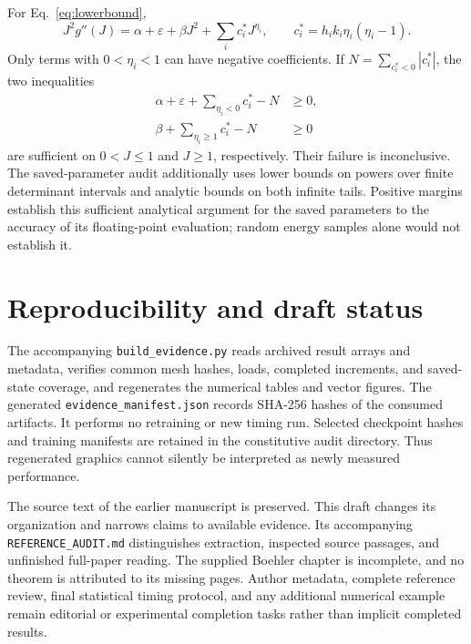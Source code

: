 \documentclass[10pt,a4paper]{article}
\begin{document}
For Eq.~\eqref{eq:lowerbound},
\begin{equation}
 J^2g''(J)=\alpha+\varepsilon+\beta J^2+\sum_i c_i^*J^{\eta_i},
 \qquad c_i^*=h_i k_i\eta_i(\eta_i-1).
\end{equation}
Only terms with $0<\eta_i<1$ can have negative coefficients. If $N=\sum_{c_i^*<0}|c_i^*|$, the two inequalities
\begin{align}
 \alpha+\varepsilon+\sum_{\eta_i<0}c_i^*-N&\geq0,\\
 \beta+\sum_{\eta_i\geq1}c_i^*-N&\geq0
\end{align}
are sufficient on $0<J\leq1$ and $J\geq1$, respectively. Their failure is inconclusive. The saved-parameter audit additionally uses lower bounds on powers over finite determinant intervals and analytic bounds on both infinite tails. Positive margins establish this sufficient analytical argument for the saved parameters to the accuracy of its floating-point evaluation; random energy samples alone would not establish it.

\section{Reproducibility and draft status}
The accompanying \texttt{build\_evidence.py} reads archived result arrays and metadata, verifies common mesh hashes, loads, completed increments, and saved-state coverage, and regenerates the numerical tables and vector figures. The generated \texttt{evidence\_manifest.json} records SHA-256 hashes of the consumed artifacts. It performs no retraining or new timing run. Selected checkpoint hashes and training manifests are retained in the constitutive audit directory. Thus regenerated graphics cannot silently be interpreted as newly measured performance.

The source text of the earlier manuscript is preserved. This draft changes its organization and narrows claims to available evidence. Its accompanying \texttt{REFERENCE\_AUDIT.md} distinguishes extraction, inspected source passages, and unfinished full-paper reading. The supplied Boehler chapter is incomplete, and no theorem is attributed to its missing pages. Author metadata, complete reference review, final statistical timing protocol, and any additional numerical example remain editorial or experimental completion tasks rather than implicit completed results.
\end{document}
